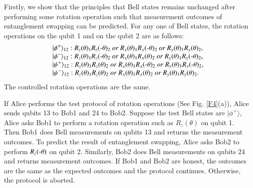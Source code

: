 \documentclass[aps,pra,showpacs,twocolumn,superscriptaddress]{revtex4-1}
\begin{document}
Firstly, we show that the principles that Bell states remains unchanged after performing some rotation operation such that measurement outcomes of entanglement swapping can be predicted. For any one of Bell states, the rotation operations on the qubit 1 and on the qubit 2 are as follows:
\begin{eqnarray*}
\setlength{\arraycolsep}{1pt}
\begin{array}{l}
\displaystyle |\phi^+\rangle_{12}:R_z(\theta)_1R_z(\textnormal{-}\theta)_2\ or \ R_x(\theta)_1R_x(\textnormal{-}\theta)_2\ or \ R_y(\theta)_1R_y(\theta)_2,\\
\displaystyle |\phi^-\rangle_{12}:{R_z(\theta)_1R_z(\textnormal{-}\theta)_2\ or\ R_x(\theta)_1R_x(\theta)_2\ or\ R_y(\theta)_1R_y(\textnormal{-}\theta)_2},\\
\displaystyle |\psi^+\rangle_{12}:{R_z(\theta)_1R_z(\theta)_2\ or\ R_x(\theta)_1R_x(\textnormal{-}\theta)_2\ or\ R_y(\theta)_1R_y(\textnormal{-}\theta)_2},\\
\displaystyle |\psi^-\rangle_{12}:{R_z(\theta)_1R_z(\theta)_2\ or\ R_x(\theta)_1R_x(\theta)_2\ or\ R_y(\theta)_1R_y(\theta)_2}.
\end{array}
\end{eqnarray*}
The controlled rotation operations are the same.


If Alice performs the test protocol of rotation operations (See Fig. \ref{F4}(a)), Alice sends qubits 13 to Bob1 and 24 to Bob2. Suppose the test Bell states are $|\phi^+\rangle$, Alice asks Bob1 to perform a rotation operation such as $R_z(\theta)$ on qubit 1. Then Bob1 does Bell measurements on qubits 13 and returns the measurement outcomes. To predict the result of entanglement swapping, Alice asks Bob2 to perform $R_z(\textnormal{-}\theta)$ on qubit 2. Similarly, Bob2 does Bell measurements on qubits 24 and returns measurement outcomes. If Bob1 and Bob2 are honest, the outcomes are the same as the expected outcomes and the protocol continues. Otherwise, the protocol is aborted.
\end{document}
